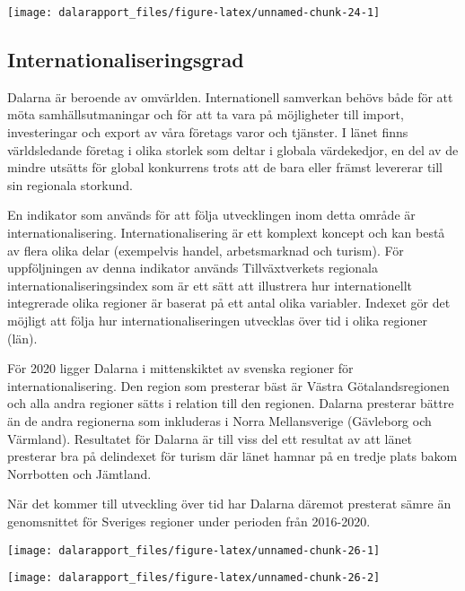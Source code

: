 \documentclass[
]{article}
\begin{document}
\begin{center}\texttt{[image: dalarapport\_files/figure-latex/unnamed-chunk-24-1]} \end{center}

\hypertarget{internationaliseringsgrad}{%
\subsection{Internationaliseringsgrad}\label{internationaliseringsgrad}}

Dalarna är beroende av omvärlden. Internationell samverkan behövs både
för att möta samhällsutmaningar och för att ta vara på möjligheter till
import, investeringar och export av våra företags varor och tjänster. I
länet finns världsledande företag i olika storlek som deltar i globala
värdekedjor, en del av de mindre utsätts för global konkurrens trots att
de bara eller främst levererar till sin regionala storkund.

En indikator som används för att följa utvecklingen inom detta område är
internationalisering. Internationalisering är ett komplext koncept och
kan bestå av flera olika delar (exempelvis handel, arbetsmarknad och
turism). För uppföljningen av denna indikator används Tillväxtverkets
regionala internationaliseringsindex som är ett sätt att illustrera hur
internationellt integrerade olika regioner är baserat på ett antal olika
variabler. Indexet gör det möjligt att följa hur internationaliseringen
utvecklas över tid i olika regioner (län).

För 2020 ligger Dalarna i mittenskiktet av svenska regioner för
internationalisering. Den region som presterar bäst är Västra
Götalandsregionen och alla andra regioner sätts i relation till den
regionen. Dalarna presterar bättre än de andra regionerna som inkluderas
i Norra Mellansverige (Gävleborg och Värmland). Resultatet för Dalarna
är till viss del ett resultat av att länet presterar bra på delindexet
för turism där länet hamnar på en tredje plats bakom Norrbotten och
Jämtland.

När det kommer till utveckling över tid har Dalarna däremot presterat
sämre än genomsnittet för Sveriges regioner under perioden från
2016-2020.

\begin{center}\texttt{[image: dalarapport\_files/figure-latex/unnamed-chunk-26-1]} \end{center}

\begin{center}\texttt{[image: dalarapport\_files/figure-latex/unnamed-chunk-26-2]} \end{center}
\end{document}
